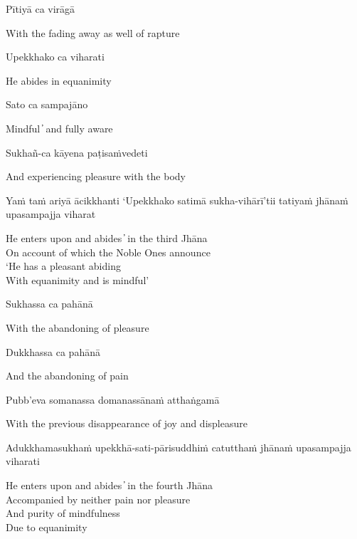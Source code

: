 Pītiyā ca virāgā

\begin{cprenglish}
With the fading away as well of rapture
\end{cprenglish}

Upekkhako ca viharati

\begin{cprenglish}
He abides in equanimity
\end{cprenglish}

Sato ca sampajāno

\begin{cprenglish}
Mindful  ̓  and fully aware
\end{cprenglish}

Sukhañ-ca kāyena paṭisaṁvedeti

\begin{cprenglish}
And experiencing pleasure with the body
\end{cprenglish}

Yaṁ taṁ ariyā ācikkhanti
‘Upekkhako satimā sukha-vihārī’tii tatiyaṁ jhānaṁ upasampajja viharat

\begin{cprenglish}
He enters upon and abides  ̓  in the third Jhāna\\
On account of which the Noble Ones announce\\
‘He has a pleasant abiding\\
With equanimity and is mindful’
\end{cprenglish}

Sukhassa ca pahānā

\begin{cprenglish}
With the abandoning of pleasure
\end{cprenglish}

Dukkhassa ca pahānā

\begin{cprenglish}
And the abandoning of pain
\end{cprenglish}

Pubb’eva somanassa domanassānaṁ atthaṅgamā

\begin{cprenglish}
With the previous disappearance of joy and displeasure
\end{cprenglish}

Adukkhamasukhaṁ upekkhā-sati-pārisuddhiṁ catutthaṁ jhānaṁ upasampajja viharati

\begin{cprenglish}
He enters upon and abides  ̓  in the fourth Jhāna\\
Accompanied by neither pain nor pleasure\\
And purity of mindfulness\\
Due to equanimity
\end{cprenglish}

